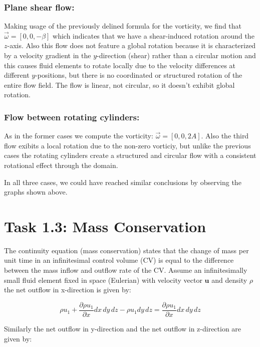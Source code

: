 \documentclass{article}
\begin{document}
\subsubsection*{Plane shear flow:}
Making usage of the previously delined formula for the vorticity, we find that $\vec{\omega}  = \left[0, 0, -\beta\right]$ which indicates that we have a shear-induced rotation around the $z$-axis. Also this flow does not feature a global rotation because it is characterized by a velocity gradient in the $y$-direction (shear) rather than a circular motion and this causes fluid elements to rotate locally due to the velocity differences at different $y$-positions, but there is no coordinated or structured rotation of the entire flow field. The flow is linear, not circular, so it doesn't exhibit global rotation. 
\subsubsection*{Flow between rotating cylinders:}
As in the former cases we compute the vorticity: $\vec{\omega} = [0, 0, 2A]$. Also the third flow exibits a local rotation due to the non-zero vorticiy, but unlike the previous cases the rotating cylinders create a structured and circular flow with a consistent rotational effect through the domain. 

In all three cases, we could have reached similar conclusions by observing the graphs shown above.

\newpage

\section*{Task 1.3: Mass Conservation}

The continuity equation (mass conservation) states that the change of mass per unit time in an infinitesimal control volume (CV) is equal to the difference between the mass inflow and outflow rate of the CV. Assume an infinitesimally small fluid element fixed in space (Eulerian) with velocity vector $\mathbf{u}$ and density $\rho$ the net outflow in x-direction is given by:

\begin{equation}
\rho u_1 + \frac{\partial \rho u_1}{\partial x} dx \, dy \, dz - \rho u_1 dy \, dz = \frac{\partial \rho u_1}{\partial x} dx \, dy \, dz
\end{equation}

Similarly the net outflow in y-direction and the net outflow in z-direction are given by:
\end{document}

